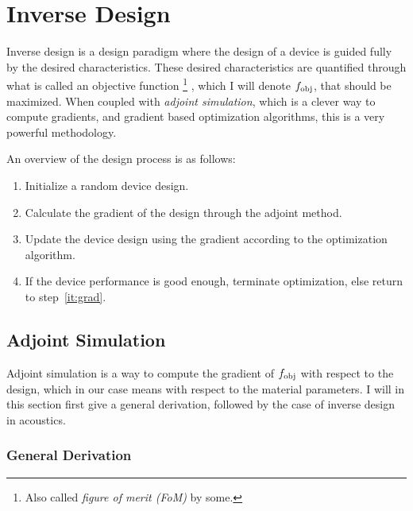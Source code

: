 

\chapter{Inverse Design}

Inverse design is a design paradigm where the design of a device is guided fully by
the desired characteristics.
These desired characteristics are quantified through what is called an objective
function%
\footnote{
	Also called \emph{figure of merit (FoM)} by some.%
}%
, which I will denote $f_\text{obj}$,
that should be maximized.
When coupled with \emph{adjoint simulation}, which is a clever way to compute
gradients, and gradient based optimization
algorithms, this is a very powerful methodology.

An overview of the design process is as follows:
\begin{enumerate}
	\item Initialize a random device design.
	\item\label{it:grad} Calculate the gradient of the design through the adjoint method.
	\item Update the device design using the gradient according to the optimization algorithm.
	\item If the device performance is good enough, terminate optimization, else
		return to step~\ref{it:grad}.
\end{enumerate}

\section{Adjoint Simulation}

Adjoint simulation is a way to compute the gradient of $f_\text{obj}$ with respect to
the design, which in our case means with respect to the material parameters.
I will in this section first give a general derivation, followed by the case of
inverse design in acoustics.

\subsection{General Derivation}\label{sec:general_derivation}

